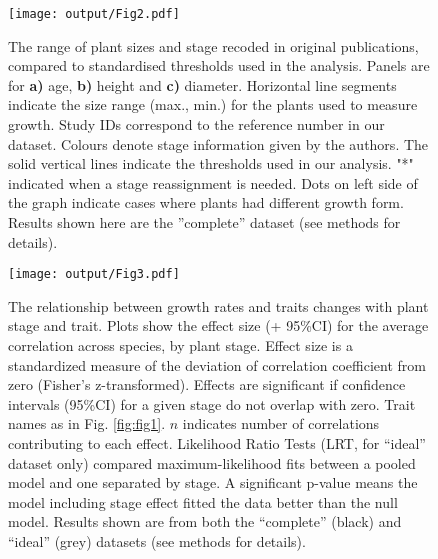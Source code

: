 \documentclass[a4paper,11pt]{article}
\begin{document}
\begin{figure}[h!]
\centering
\texttt{[image: output/Fig2.pdf]}
\caption{The range of plant sizes and stage recoded in original publications, compared to standardised thresholds used in the analysis. Panels are for
\textbf{a)} age, \textbf{b)} height and \textbf{c)} diameter. Horizontal line segments indicate the size range (max., min.) for the plants used to measure growth. Study IDs correspond to the reference number in our dataset. Colours denote stage information given by the authors. The solid vertical lines indicate the thresholds used in our analysis. "*" indicated when a stage reassignment is needed. Dots on left side of the graph indicate cases where plants had different growth form. Results shown here are the ''complete'' dataset (see methods for details).}
\label{fig:fig2}
\end{figure}

\begin{figure}[h!]
\centering
\texttt{[image: output/Fig3.pdf]}
\caption{The relationship between growth rates and traits changes with plant stage and trait. Plots show the effect size (+ 95\%CI) for the average correlation across species, by plant stage. Effect size is a standardized measure of the deviation of correlation coefficient from zero (Fisher's z-transformed). Effects are significant if confidence intervals (95\%CI) for a given stage do not overlap with zero.  Trait names as in Fig. \ref{fig:fig1}. $n$ indicates number of correlations contributing to each effect. Likelihood Ratio Tests (LRT, for ``ideal'' dataset only) compared maximum-likelihood fits between a pooled model and one separated by stage. A significant p-value means the model including stage effect fitted the data better than the null model. Results shown are from both the ``complete'' (black)  and ``ideal'' (grey) datasets (see methods for details).}
\label{fig:fig3}
\end{figure}

\clearpage
\end{document}
